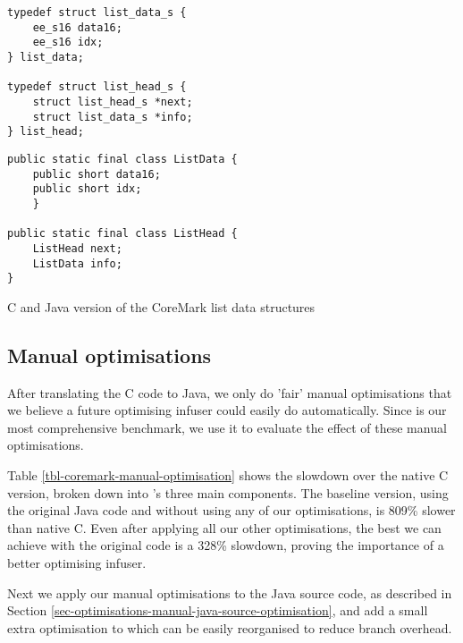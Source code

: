 \begin{listing}
\centering
\begin{minipage}[t]{0.48\textwidth}
\centering
\begin{verbatim}
typedef struct list_data_s {
    ee_s16 data16;
    ee_s16 idx;
} list_data;

typedef struct list_head_s {
    struct list_head_s *next;
    struct list_data_s *info;
} list_head;
\end{verbatim}
\end{minipage}\hfill
\begin{minipage}[t]{0.48\textwidth}
\centering
\begin{verbatim}
public static final class ListData {
    public short data16;
    public short idx;
    }

public static final class ListHead {
    ListHead next;
    ListData info;
}
\end{verbatim}
\end{minipage}
\caption{C and Java version of the CoreMark list data structures}
\label{lst-coremark-list-data-structures}
\end{listing}

\subsection{Manual optimisations}
\label{sec-evaluation-manual-optimisations}
After translating the C code to Java, we only do 'fair' manual optimisations that we believe a future optimising infuser could easily do automatically. Since  is our most comprehensive benchmark, we use it to evaluate the effect of these manual optimisations.



Table \ref{tbl-coremark-manual-optimisation} shows the slowdown over the native C version, broken down into 's three main components. The baseline version, using the original Java code and without using any of our optimisations, is 809\% slower than native C. Even after applying all our other optimisations, the best we can achieve with the original code is a 328\% slowdown, proving the importance of a better optimising infuser.

Next we apply our manual optimisations to the Java source code, as described in Section \ref{sec-optimisations-manual-java-source-optimisation}, and add a small extra optimisation to  which can be easily reorganised to reduce branch overhead.

